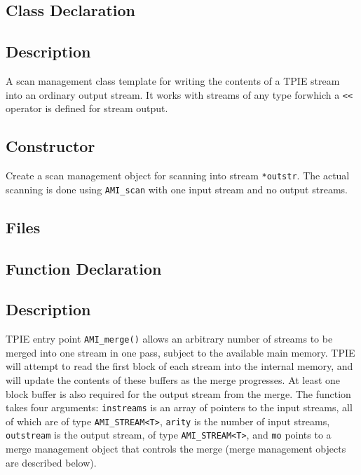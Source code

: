 \subsection{Class Declaration}
\btabb {} {}
\etabb

\subsection{Description}
A scan management class template for writing the contents of a TPIE
stream into an ordinary \CPP{} output stream.  It works with streams
of any type forwhich a \lstinline|<<| operator is defined for \CPP{}
stream output.

\subsection{Constructor} 
\btabb {}
{Create a scan management object for scanning into \CPP{} stream
  \lstinline|*outstr|. The actual scanning is done using
  \lstinline|AMI_scan| with one input stream and no output streams.}
\etabb




\subsection{Files}
  \btabb
     {}
  \etabb

\subsection{Function Declaration}
  \btabb
     {}
  \etabb

\subsection{Description}
TPIE entry point \lstinline|AMI_merge()| allows an arbitrary number of
streams to be merged into one stream in one pass, subject to the
available main memory.  TPIE will attempt to read the first block of each
stream into the internal memory, and will update the contents of these
buffers as the merge progresses. At least one block buffer is also
required for the output stream from the merge.  The function takes
four arguments: \lstinline|instreams| is an array of pointers to the
input streams, all of which are of type \lstinline|AMI_STREAM<T>|,
\lstinline|arity| is the number of input streams,
\lstinline|outstream| is the output stream, of type
\lstinline|AMI_STREAM<T>|, and \lstinline|mo| points to a merge
management object that controls the merge (merge management objects
are described below).

